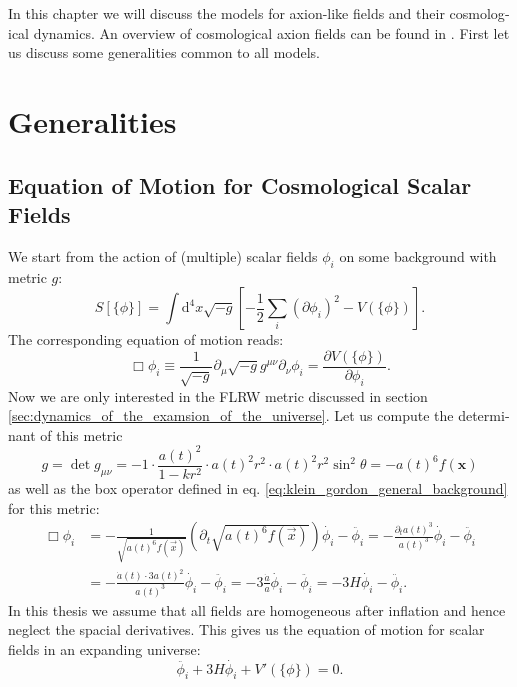 \documentclass[master,       %
               twoside,        %
               BCOR10mm,       %
               english,ngerman, %
               ]{GAUBM}
\begin{document}
\begin{otherlanguage}{english}
In this chapter we will discuss the models for axion-like fields and their cosmological dynamics.
An overview of cosmological axion fields can be found in \cite{MarshAxionCosmo}.
First let us discuss some generalities common to all models.


\section{Generalities}

\subsection{Equation of Motion for Cosmological Scalar Fields}
We start from the action of (multiple) scalar fields $\phi_i$ on some background with metric $g$:
\begin{equation}
	S[\{\phi\}] = \int \mathrm{d}^4 x \sqrt{-g} \left[- \frac{1}{2} \sum_i (\partial \phi_i)^2 - V(\{\phi\}) \right].
\end{equation}
The corresponding equation of motion reads:
\begin{equation}
	\label{eq:klein_gordon_general_background}
	\Box \phi_i \equiv \frac{1}{\sqrt{-g}} \partial_\mu \sqrt{-g} g^{\mu \nu} \partial_\nu \phi_i = \frac{\partial V(\{\phi\})}{\partial \phi_i}.
\end{equation}
Now we are only interested in the FLRW metric discussed in section \ref{sec:dynamics_of_the_examsion_of_the_universe}.
Let us compute the determinant of this metric
\begin{equation}
	g = \det g_{\mu \nu} = -1 \cdot \frac{a(t)^2}{1 - kr^2} \cdot a(t)^2 r^2 \cdot a(t)^2 r^2 \sin^2 \theta = - a(t)^6 f(\mathbf{x})
\end{equation}
as well as the box operator defined in eq. \eqref{eq:klein_gordon_general_background} for this metric:
\begin{align}
	    \Box \phi_i
	    &= - \frac{1}{\sqrt{a(t)^6 f(\vec{x})}} (\partial_t \sqrt{ a(t)^6 f(\vec{x}) }) \dot{\phi_i} - \ddot{\phi_i}
	    = - \frac{\partial_t a(t)^3}{a(t)^3} \dot{\phi_i} - \ddot{\phi_i} \nonumber \\
	    &= - \frac{\dot{a}(t) \cdot 3 a(t)^2}{a(t)^3} \dot{\phi_i} - \ddot{\phi_i}
	    = - 3 \frac{\dot{a}}{a} \dot{\phi_i} - \ddot{\phi_i}
	    = - 3H \dot{\phi_i} - \ddot{\phi_i}.
\end{align}
In this thesis we assume that all fields are homogeneous after inflation and hence neglect the spacial derivatives.
This gives us the equation of motion for scalar fields in an expanding universe:
\begin{equation}
	\label{eq:scalar_field_eom}
	\ddot{\phi_i} + 3 H \dot{\phi_i} + V'(\{\phi\}) = 0.
\end{equation}


\end{otherlanguage}
\end{document}
